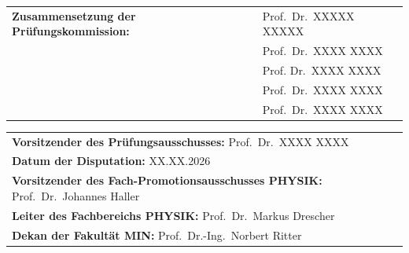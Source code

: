 \noindent
\begin{tabular}{l l}
\textbf{Zusammensetzung der Pr\"ufungskommission:} & Prof.\ Dr.\ XXXXX XXXXX \\[0.3cm]
                                                   & Prof.\ Dr.\ XXXX XXXX \\[0.3cm]
                                                   & Prof. Dr.\ XXXX XXXX \\[0.3cm]
                                                   & Prof.\ Dr.\ XXXX XXXX \\[0.3cm]
                                                   & Prof.\ Dr.\ XXXX XXXX \\
\end{tabular}

\vspace{1.5cm}

\noindent
\begin{tabular}{l}
\textbf{Vorsitzender des Pr\"ufungsausschusses:} Prof.\ Dr.\ XXXX XXXX \\[0.5cm]
\textbf{Datum der Disputation:} XX.XX.2026 \\[0.5cm]
\textbf{Vorsitzender des Fach-Promotionsausschusses PHYSIK:} Prof.\ Dr.\ Johannes Haller\ \\[0.5cm]
\textbf{Leiter des Fachbereichs PHYSIK:} Prof.\ Dr.\ Markus Drescher \\[0.5cm]
\textbf{Dekan der Fakult\"at MIN:} Prof.\ Dr.-Ing.\ Norbert Ritter
\end{tabular}

%
